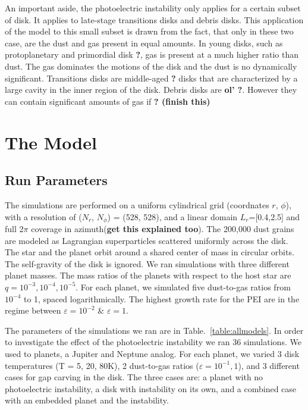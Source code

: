 \documentclass[onecolumn]{report}
\newcommand{\epsi}{\varepsilon}
\begin{document}
An important aside, the photoelectric instability only applies for a certain subset of disk. It applies to late-stage transitions disks and debris disks. This application of the model to this small subset is drawn from the fact, that only in these two case, are the dust and gas present in equal amounts. In young disks, such as protoplanetary and primordial disk \textbf{?}, gas is present at a much higher ratio than dust. The gas dominates the motions of the disk and the dust is no dynamically significant. Transitions disks are middle-aged \textbf{?} disks that are characterized by a large cavity in the inner region of the disk. Debris disks are \textbf{ol' ?}. However they can contain significant amounts of gas if \textbf{? (finish this)}

\section{The Model}

\subsection{Run Parameters}

The simulations are performed on a uniform cylindrical grid (coordnates $r$, $\phi$), with a resolution of ($N_r$, $N_{\phi}$) = (528, 528), and a linear domain $L_r$=[0.4,2.5] and full 2$\pi$ coverage in azimuth(\textbf{get this explained too}). The 200,000 dust grains are modeled as Lagrangian superparticles scattered uniformly across the disk. The star and the planet orbit around a shared center of mass in circular orbits. The self-gravity of the disk is ignored. We ran simulations with three different planet masses. The mass ratios of the planets with respect to the host star are $q = 10^{-3}, 10^{-4}, 10^{-5}$. For each planet, we simulated five dust-to-gas ratios from $10^{-4}$ to 1, spaced logarithmically. The highest growth rate for the PEI are in the regime between $\epsi=10^{-2}$ \& $\epsi=1$.

The parameters of the simulations we ran are in Table.~\ref{table:allmodels}. In order to investigate the effect of the photoelectric instability we ran 36 simulations. We used to planets, a Jupiter and Neptune analog. For each planet, we varied 3 disk temperatures (T = 5, 20, 80K), 2 dust-to-gas ratios ($\epsi=10^{-1},1$), and 3 different cases for gap carving in the disk. The three cases are: a planet with no photoelectric instability, a disk with instability on its own, and a combined case with an embedded planet and the instability.
\end{document}
